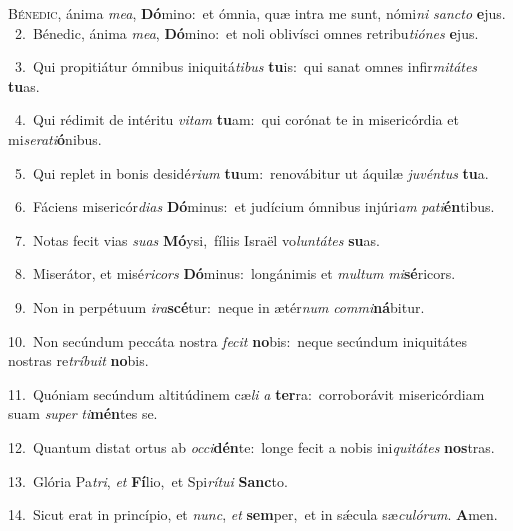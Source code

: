 \lettrine{\initial\textcolor{\initialcolor}{B}}{énedic,} ánima \textit{me}\-\textit{a}, \textbf{Dó}\-mino:~\star et ómnia, quæ intra me sunt, nómi\textit{ni} \textit{sanc}\-\textit{to} \textbf{e}\-jus.\\
{\numbfont\textcolor{\numbcolor}{~2.}}~Bénedic, ánima \textit{me}\-\textit{a}, \textbf{Dó}\-mino:~\star et noli oblivísci omnes retribu\-\textit{ti}\-\textit{ó}\textit{nes} \textbf{e}\-jus.\par
{\numbfont\textcolor{\numbcolor}{~3.}}~Qui propitiátur ómnibus iniquitá\-\textit{ti}\-\textit{bus} \textbf{tu}\-is:~\star qui sanat omnes infir\-\textit{mi}\-\textit{tá}\textit{tes} \textbf{tu}\-as.\par
{\numbfont\textcolor{\numbcolor}{~4.}}~Qui rédimit de intéritu \textit{vi}\-\textit{tam} \textbf{tu}\-am:~\star qui corónat te in misericórdia et mi\-\textit{se}\-\textit{ra}\textit{ti}\textbf{ó}nibus.\par
{\numbfont\textcolor{\numbcolor}{~5.}}~Qui replet in bonis desidé\-\textit{ri}\-\textit{um} \textbf{tu}\-um:~\star renovábitur ut áquilæ \textit{ju}\-\textit{vén}\textit{tus} \textbf{tu}\-a.\par
{\numbfont\textcolor{\numbcolor}{~6.}}~Fáciens misericór\-\textit{di}\-\textit{as} \textbf{Dó}\-minus:~\star et judícium ómnibus injúri\textit{am} \textit{pa}\-\textit{ti}\textbf{én}tibus.\par
{\numbfont\textcolor{\numbcolor}{~7.}}~Notas fecit vias \textit{su}\-\textit{as} \textbf{Mó}\-ysi,~\star fíliis Israël vo\-\textit{lun}\-\textit{tá}\textit{tes} \textbf{su}\-as.\par
{\numbfont\textcolor{\numbcolor}{~8.}}~Miserátor, et misé\-\textit{ri}\-\textit{cors} \textbf{Dó}\-minus:~\star longánimis et \textit{mul}\-\textit{tum} \textit{mi}\-\textbf{sé}ricors.\par
{\numbfont\textcolor{\numbcolor}{~9.}}~Non in perpétuum \textit{i}\-\textit{ra}\textbf{scé}tur:~\star neque in ætér\textit{num} \textit{com}\-\textit{mi}\textbf{ná}bitur.\par
{\numbfont\textcolor{\numbcolor}{10.}}~Non secúndum peccáta nostra \textit{fe}\-\textit{cit} \textbf{no}\-bis:~\star neque secúndum iniquitátes nostras re\-\textit{trí}\-\textit{bu}\textit{it} \textbf{no}\-bis.\par
{\numbfont\textcolor{\numbcolor}{11.}}~Quóniam secúndum altitúdinem cæ\textit{li} \textit{a} \textbf{ter}\-ra:~\star corroborávit misericórdiam suam \textit{su}\-\textit{per} \textit{ti}\-\textbf{mén}tes se.\par
{\numbfont\textcolor{\numbcolor}{12.}}~Quantum distat ortus ab \textit{oc}\-\textit{ci}\textbf{dén}te:~\star longe fecit a nobis ini\-\textit{qui}\-\textit{tá}\textit{tes} \textbf{nos}\-tras.\par
{\numbfont\textcolor{\numbcolor}{13.}}~Glória Pa\-\textit{tri}\-, \textit{et} \textbf{Fí}\-lio,~\star et Spi\-\textit{rí}\-\textit{tu}\textit{i} \textbf{Sanc}\-to.\par
{\numbfont\textcolor{\numbcolor}{14.}}~Sicut erat in princípio, et \textit{nunc}\-, \textit{et} \textbf{sem}\-per,~\star et in sǽcula sæ\-\textit{cu}\-\textit{ló}\textit{rum}. \textbf{A}\-men.\par
